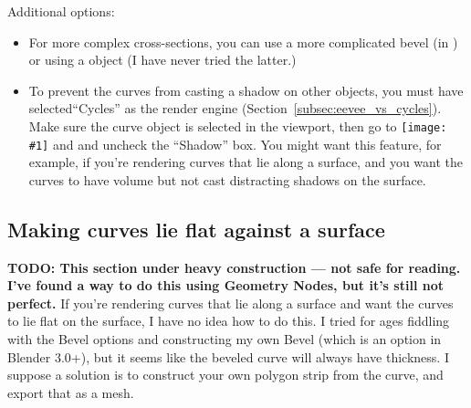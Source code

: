 \documentclass[10pt]{article}
\newcommand{\obj}[1]{\menu{\color{magenta} #1}}
\DeclareRobustCommand{\inlinepic}[1]{%
  \begingroup\normalfont
  \texttt{[image: \#1]}%
  \endgroup
}
\begin{document}
Additional options:
\begin{itemize}
    \item For more complex cross-sections, you can use a more complicated bevel (in ) or using a \obj{Bevel} object (I have never tried the latter.)
    \item To prevent the curves from casting a shadow on other objects, you must have selected``Cycles'' as the render engine (Section~\ref{subsec:eevee_vs_cycles}). Make sure the curve object is selected in the viewport, then go to  \inlinepic{images/object-properties-icon.png} and  and uncheck the ``Shadow'' box. You might want this feature, for example, if you're rendering curves that lie along a surface, and you want the curves to have volume but not cast distracting shadows on the surface.
\end{itemize}



\subsection{Making curves lie flat against a surface}
{\bf TODO: This section under heavy construction --- not safe for reading. I've found a way to do this using Geometry Nodes, but it's still not perfect.}
If you're rendering curves that lie along a surface and want the curves to lie flat on the surface, I have no idea how to do this. I tried for ages fiddling with the Bevel options and constructing my own Bevel (which is an option in Blender 3.0+), but it seems like the beveled curve will always have thickness. I suppose a solution is to construct your own polygon strip from the curve, and export that as a mesh.
\end{document}
